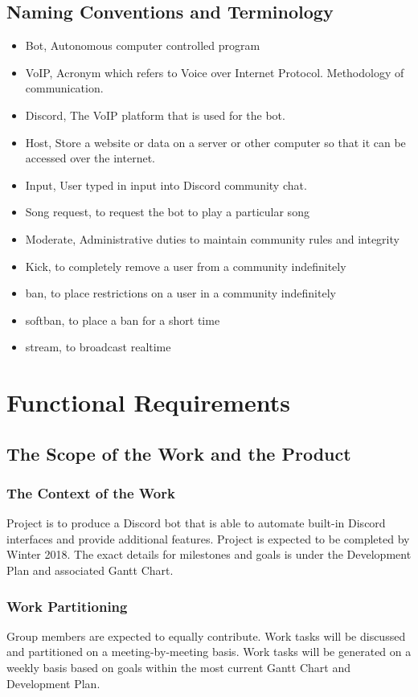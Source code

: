 \documentclass[12pt, titlepage]{article}
\begin{document}
\subsection{Naming Conventions and Terminology}
\begin{itemize}
\item Bot, Autonomous computer controlled program 
\item VoIP, Acronym which refers to Voice over Internet Protocol. Methodology of communication. 
\item Discord, The VoIP platform that is used for the bot.
\item Host, Store a website or data on a server or other computer so that it can be accessed over the internet.
\item Input, User typed in input into Discord community chat.
\item Song request, to request the bot to play a particular song
\item Moderate, Administrative duties to maintain community rules and integrity
\item Kick, to completely remove a user from a community indefinitely
\item ban, to place restrictions on a user in a community indefinitely 
\item softban, to place a ban for a short time
\item stream, to broadcast realtime
\end{itemize}

\section{Functional Requirements}

\subsection{The Scope of the Work and the Product}

\subsubsection{The Context of the Work}
Project is to produce a Discord bot that is able to automate built-in Discord interfaces and provide additional features. Project is expected to be completed by Winter 2018. The exact details for milestones and goals is under the Development Plan and associated Gantt Chart. 

\subsubsection{Work Partitioning}
Group members are expected to equally contribute. Work tasks will be discussed and partitioned on a meeting-by-meeting basis. Work tasks will be generated on a weekly basis based on goals within the most current Gantt Chart and Development Plan.
\end{document}
